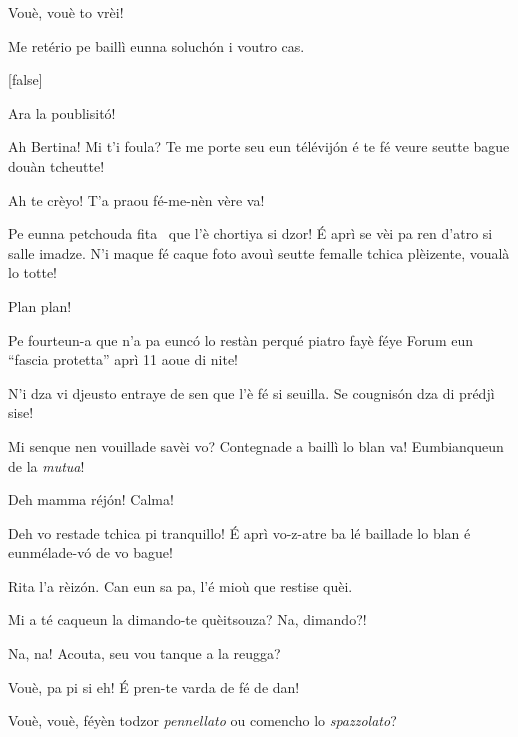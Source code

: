 \begin{drama}
\Pascalspeaks {} Vouè, vouè to vrèi!

\DzeudzoSenliquerspeaks Me retério pe baillì eunna soluchón i voutro cas.

[false]



\Ritaspeaks {} Ara la poublisitó!


\Tobiespeaks {} Ah Bertina! Mi t'i foula? Te me porte seu eun télévij\'on é te fé veure seutte bague douàn tcheutte!

\Bertinaspeaks {} Ah te crèyo! T’a praou fé-me-nèn vère va! 

\Tobiespeaks Pe eunna petchouda fita \fitaa\ que l’è chortiya si dzor! É aprì se vèi pa ren d’atro si salle imadze. N’i maque fé caque foto avouì seutte femalle tchica plèizente, voualà lo totte!

\Pascalspeaks {} Plan plan!

\Bertinaspeaks Pe fourteun-a que n’a pa eunc\'o lo restàn perqué piatro fayè féye Forum eun ``fascia protetta'' aprì 11 aoue di nite!

\Eumprezeospeaks N’i dza vi djeusto entraye de sen que l’è fé si seuilla. Se cougnisón dza di prédjì sise!

\Tobiespeaks Mi senque nen vouillade savèi vo? Contegnade a baillì lo blan va! Eumbianqueun de la \textit{mutua}!

\Simonspeaks Deh mamma réjón! Calma!

\Ritaspeaks {} Deh vo restade tchica pi tranquillo!  É aprì vo-z-atre ba lé baillade lo blan é eun\-mé\-la\-de-vó de vo bague!

\Simonspeaks Rita l’a rèizón. Can eun sa pa, l’é mioù que restise quèi.

\Eumprezeospeaks Mi a té caqueun la dimando-te quèitsouza? Na, dimando?!

\Simonspeaks Na, na! Acouta, seu vou tanque a la reugga?

\Eumprezeospeaks Vouè, pa pi si eh! É pren-te varda de fé de dan!

\Simonspeaks Vouè, vouè, féyèn todzor \textit{pennellato} ou comencho lo \textit{spazzolato}?


\end{drama}
